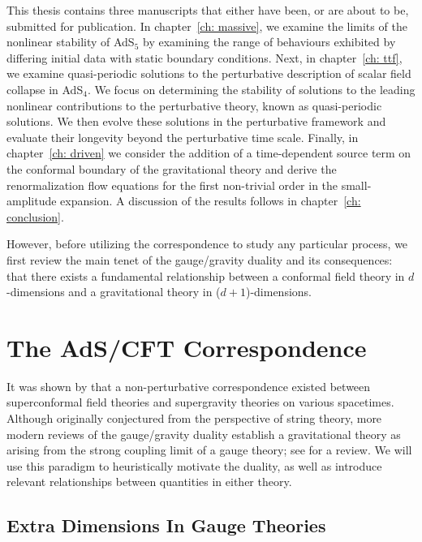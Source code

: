 \documentclass[../PhD.tex]{subfiles}
\begin{document}
This thesis contains three manuscripts that either have been, or are about to be, submitted for publication. In chapter~\ref{ch: massive}, we examine the limits of the nonlinear stability of AdS$_5$ by examining the range of behaviours exhibited by differing initial data with static boundary conditions. Next, in chapter~\ref{ch: ttf}, we examine quasi-periodic solutions to the perturbative description of scalar field collapse in AdS$_4$. We focus on determining the stability of solutions to the leading nonlinear contributions to the perturbative theory, known as quasi-periodic solutions. We then evolve these solutions in the perturbative framework and evaluate their longevity beyond the perturbative time scale. Finally, in chapter~\ref{ch: driven} we consider the addition of a time-dependent source term on the conformal boundary of the gravitational theory and derive the renormalization flow equations for the first non-trivial order in the small-amplitude expansion. A discussion of the results follows in chapter~\ref{ch: conclusion}.

However, before utilizing the correspondence to study any particular process, we first review the main tenet of the gauge/gravity duality and its consequences: that there exists a fundamental relationship between a conformal field theory in $d$-dimensions and a gravitational theory in ($d + 1$)-dimensions.


\section{The AdS/CFT Correspondence}
\label{sec: ads/cft}

It was shown by \cite{hep-th/9711200} that a non-perturbative correspondence existed between superconformal field theories and supergravity theories on various spacetimes. Although originally conjectured from the perspective of string theory, more modern reviews of the gauge/gravity duality establish a gravitational theory as arising from the strong coupling limit of a gauge theory; see \cite{gr-qc/0602037} for a review. We will use this paradigm to heuristically motivate the duality, as well as introduce relevant relationships between quantities in either theory.  


\subsection{Extra Dimensions In Gauge Theories}
\label{ssec: extra dims in gauge theories}
\end{document}
